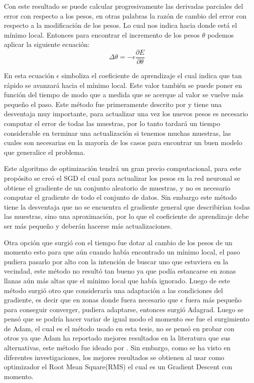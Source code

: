 \par Con este resultado se puede calcular progresivamente las derivadas parciales del error con respecto a los pesos, en otras palabras la razón de cambio del error con respecto a la modificación de los pesos. Lo cual nos indica hacia donde está el mínimo local. Entonces para encontrar el incremento de los pesos $\theta$ podemos aplicar la siguiente ecuación:
\[ \Delta \theta =-\epsilon \frac{\partial E}{\partial \theta }\]

\par En esta ecuación $\epsilon$ simboliza el coeficiente de aprendizaje el cual indica que tan rápido se avanzará hacia el mínimo local. Este valor también se puede poner en función del tiempo de modo que a medida que se acerque al valor se vuelve más pequeño el paso. Este método fue primeramente descrito por \cite{rumelhart1986learning} y tiene una desventaja muy importante, para actualizar una vez los nuevos pesos es necesario computar el error de todas las muestras, por lo tanto tardará un tiempo considerable en terminar una actualización si tenemos muchas muestras, las cuales son necesarias en la mayoría de los casos para encontrar un buen modelo que generalice el problema.

\par Este algoritmo de optimización tendrá un gran precio computacional, para este propósito se creó el \gls{SGD} el cual para actualizar los pesos en la red neuronal se obtiene el gradiente de un conjunto aleatorio de muestras, y no es necesario computar el gradiente de todo el conjunto de datos. Sin embargo este método tiene la desventaja que no se encuentra el gradiente general que describirían todas las muestras, sino una aproximación, por lo que el coeficiente de aprendizaje debe ser más pequeño y deberán hacerse más actualizaciones.

\par Otra opción que surgió con el tiempo fue dotar al cambio de los pesos de un momento esto para que aún cuando había encontrado un mínimo local, el paso pudiera pasarlo por alto con la intención de buscar uno que estuviera en la vecindad, este método no resultó tan bueno ya que podía estancarse en zonas llanas aún más altas que el mínimo local que había ignorado. Luego de este método surgió otro que consideraría una adaptación a las condiciones del gradiente, es decir que en zonas donde fuera necesario que $\epsilon$ fuera más pequeño para conseguir converger, pudiera adaptarse, entonces surgió Adagrad. Luego se pensó que se podría hacer variar de igual modo el momento ese fue el surgimiento de Adam, el cual es el método usado en esta tesis, no se pensó en probar con otros ya que Adam ha reportado mejores resultados en la literatura que sus alternativas, este método fue ideado por \cite{kingma2014adam}.  Sin embargo, como se ha visto en diferentes investigaciones, los mejores resultados se obtienen al usar como optimizador el Root Mean Square(RMS) el cual es un Gradient Descent con momento.
\nocite{DBLP:journals/corr/Ruder16}

